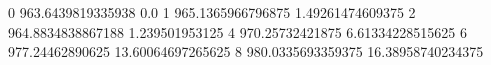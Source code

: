 0 963.6439819335938 0.0
1 965.1365966796875 1.49261474609375
2 964.8834838867188 1.239501953125
4 970.25732421875 6.61334228515625
6 977.24462890625 13.60064697265625
8 980.0335693359375 16.38958740234375
